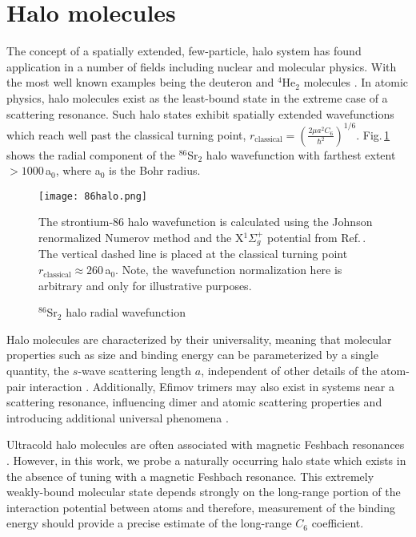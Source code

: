 \section{Halo molecules} \label{sec:halo}
The concept of a spatially extended, few-particle, halo system has found application in a number of fields including nuclear and molecular physics.
With the most well known examples being the deuteron and $^4$He$_2$ molecules \cite{lmk93,sto94,Kohler2006}.
In atomic physics, halo molecules exist as the least-bound state in the extreme case of a scattering resonance.
Such halo states exhibit spatially extended wavefunctions which reach well past the classical turning point, $r_\text{classical}=\left( \frac{2 \mu a^2 C_6}{\hbar^2} \right)^{1/6}$.
Fig.\,\ref{fig:86halo} shows the radial component of the $^{86}$Sr$_2$ halo wavefunction with farthest extent $>\!1000$\,a$_0$, where a$_0$ is the Bohr radius.
\begin{figure}
	\centerline{
	\texttt{[image: 86halo.png]}}
	\caption{$^{86}$Sr$_2$ halo radial wavefunction}{The strontium-86 halo wavefunction is calculated using the Johnson renormalized Numerov method \cite{Gibson2016, Johnson1978} and the X$^1\Sigma_g^+$ potential from Ref.\,\cite{Stein2010}. The vertical dashed line is placed at the classical turning point $r_\text{classical} \approx 260$\,a$_0$. Note, the wavefunction normalization here is arbitrary and only for illustrative purposes.}
	\label{fig:86halo}
\end{figure} 
Halo molecules are characterized by their universality, meaning that molecular properties such as size and binding energy can be parameterized by a single quantity, the $s$-wave scattering length $a$, independent of other details of the atom-pair interaction \cite{Kohler2006,bha06}. 
Additionally, Efimov trimers may also exist in systems near a scattering resonance, influencing dimer and atomic scattering properties and introducing additional universal phenomena \cite{bha07,nen17}.

Ultracold halo molecules are often associated with magnetic Feshbach resonances \cite{Chin2010}.
However, in this work, we probe a naturally occurring halo state which exists in the absence of tuning with a magnetic Feshbach resonance. 
This extremely weakly-bound molecular state depends strongly on the long-range portion of the interaction potential between atoms and therefore, measurement of the binding energy should provide a precise estimate of the long-range $C_6$ coefficient.

